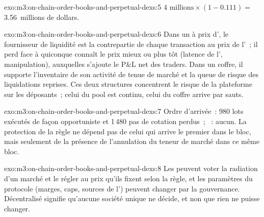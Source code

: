 \begin{solution}{exo:m3:on-chain-order-books-and-perpetual-dexs:5}
$4\text{ millions} \times (1 - 0.111) = $ 3.56~millions de dollars.
\end{solution}

\begin{solution}{exo:m3:on-chain-order-books-and-perpetual-dexs:6}
Dans un  à prix d', le fournisseur de liquidité est la contrepartie de chaque transaction au prix de l'~; il perd face à quiconque connaît le prix mieux ou plus tôt
(latence de l', manipulation), auxquelles s'ajoute le P\&L net des traders. Dans un coffre, il supporte l'inventaire de son activité de tenue de marché et la queue de risque des liquidations reprises.
Ces deux structures concentrent le risque de la plateforme sur les déposants~; celui du pool est continu, celui du coffre arrive par sauts.
\end{solution}

\begin{solution}{exo:m3:on-chain-order-books-and-perpetual-dexs:7}
Ordre d'arrivée~: 980 lots exécutés de façon opportuniste et 1\,480 pas de cotation perdus~; ~: aucun. La protection de la règle ne dépend pas de celui qui arrive le premier
dans le bloc, mais seulement de la présence de l'annulation du teneur de marché dans ce même bloc.
\end{solution}

\begin{solution}{exo:m3:on-chain-order-books-and-perpetual-dexs:8}
Les  peuvent voter la radiation d'un marché et le régler au prix qu'ils fixent selon la règle, et les paramètres du protocole (marges, caps, sources de l') peuvent changer par la gouvernance.
Décentralisé signifie qu'aucune société unique ne décide, et non que rien ne puisse changer.
\end{solution}

